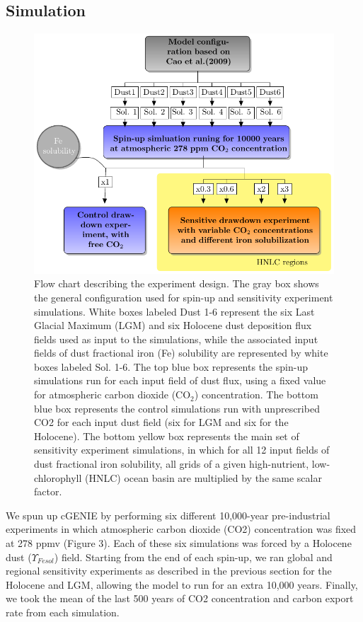 \subsection{Simulation}

\begin{figure}[h!]
    \includegraphics[scale=1]{../Paper_Draft/tikz/Figure3_diagram.tex.preview.pdf}
    \caption{Flow chart describing the experiment design. The gray box shows the general configuration used for spin-up and sensitivity experiment simulations. White boxes labeled Dust 1-6 represent the six Last Glacial Maximum (LGM) and six Holocene dust deposition flux fields used as input to the simulations, while the associated input fields of dust fractional iron (Fe) solubility are represented by white boxes labeled Sol. 1-6. The top blue box represents the spin-up simulations run for each input field of dust flux, using a fixed value for atmospheric carbon dioxide (CO$_2$) concentration. The bottom blue box represents the control simulations run with unprescribed CO2 for each input dust field (six for LGM and six for the Holocene). The bottom yellow box represents the main set of sensitivity experiment simulations, in which for all 12 input fields of dust fractional iron solubility, all grids of a given high-nutrient, low-chlorophyll (HNLC) ocean basin  are multiplied by the same scalar factor. }
\end{figure}

We spun up cGENIE by performing six different 10,000-year pre-industrial experiments in which atmospheric carbon dioxide (CO2) concentration was fixed at 278 ppmv (Figure 3). Each of these six simulations was forced by a Holocene dust ($\Upsilon_{Fesol}$) field. Starting from the end of each spin-up, we ran global and regional sensitivity experiments as described in the previous section for the Holocene and LGM, allowing the model to run for an extra 10,000 years. Finally, we took the mean of the last 500 years of CO2 concentration and carbon export rate from each simulation.
